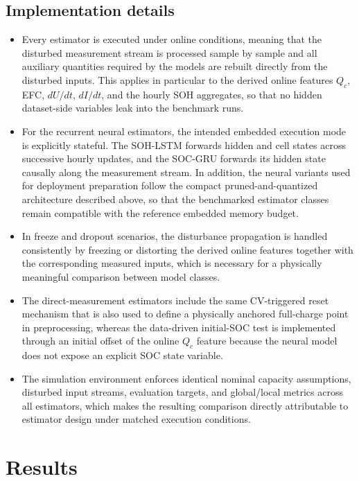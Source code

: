 \documentclass[review]{elsarticle}
\begin{document}
\subsection{Implementation details}
\begin{itemize}[leftmargin=*]
    \item Every estimator is executed under online conditions, meaning that the disturbed measurement stream is processed sample by sample and all auxiliary quantities required by the models are rebuilt directly from the disturbed inputs. This applies in particular to the derived online features $Q_c$, EFC, $dU/dt$, $dI/dt$, and the hourly SOH aggregates, so that no hidden dataset-side variables leak into the benchmark runs.
    \item For the recurrent neural estimators, the intended embedded execution mode is explicitly stateful. The SOH-LSTM forwards hidden and cell states across successive hourly updates, and the SOC-GRU forwards its hidden state causally along the measurement stream. In addition, the neural variants used for deployment preparation follow the compact pruned-and-quantized architecture described above, so that the benchmarked estimator classes remain compatible with the reference embedded memory budget.
    \item In freeze and dropout scenarios, the disturbance propagation is handled consistently by freezing or distorting the derived online features together with the corresponding measured inputs, which is necessary for a physically meaningful comparison between model classes.
    \item The direct-measurement estimators include the same CV-triggered reset mechanism that is also used to define a physically anchored full-charge point in preprocessing, whereas the data-driven initial-SOC test is implemented through an initial offset of the online $Q_c$ feature because the neural model does not expose an explicit SOC state variable.
    \item The simulation environment enforces identical nominal capacity assumptions, disturbed input streams, evaluation targets, and global/local metrics across all estimators, which makes the resulting comparison directly attributable to estimator design under matched execution conditions.
\end{itemize}

\section{Results}
\end{document}
